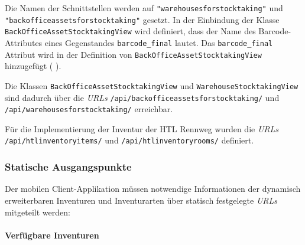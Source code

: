 \begin{Shaded}
\begin{Highlighting}[]
\OperatorTok{=}\NormalTok{ [}
        \NormalTok{, }
\OperatorTok{=}\NormalTok{),}
        \NormalTok{, }
\OperatorTok{=}\NormalTok{),}
\NormalTok{]}
\end{Highlighting}
\end{Shaded}

Die Namen der Schnittstellen werden auf
\texttt{"warehousesforstocktaking"} und
\texttt{"backofficeassetsforstocktaking"} gesetzt. In der Einbindung der
Klasse \texttt{BackOfficeAssetStocktakingView} wird definiert, dass der
Name des Barcode-Attributes eines Gegenstandes \texttt{barcode\_final}
lautet. Das \texttt{barcode\_final} Attribut wird in der Definition von
\texttt{BackOfficeAssetStocktakingView} hinzugefügt (\sa{}
).

Die Klassen \texttt{BackOfficeAssetStocktakingView} und
\texttt{WarehouseStocktakingView} sind dadurch über die \emph{URLs}
\texttt{/api/backofficeassetsforstocktaking/} und
\texttt{/api/warehousesforstocktaking/} erreichbar.

Für die Implementierung der Inventur der HTL Rennweg wurden die
\emph{URLs} 
\texttt{/api/htlinventoryitems/} und \texttt{/api/htlinventoryrooms/}
definiert.

\hypertarget{statische-ausgangspunkte}{%
\subsubsection{Statische
Ausgangspunkte}\label{statische-ausgangspunkte}}

Der mobilen Client-Applikation müssen notwendige Informationen der
dynamisch erweiterbaren Inventuren und Inventurarten über statisch
festgelegte \emph{URLs} 
mitgeteilt werden:

\hypertarget{verfuxfcgbare-inventuren}{%
\paragraph{Verfügbare Inventuren}\label{verfuxfcgbare-inventuren}}

